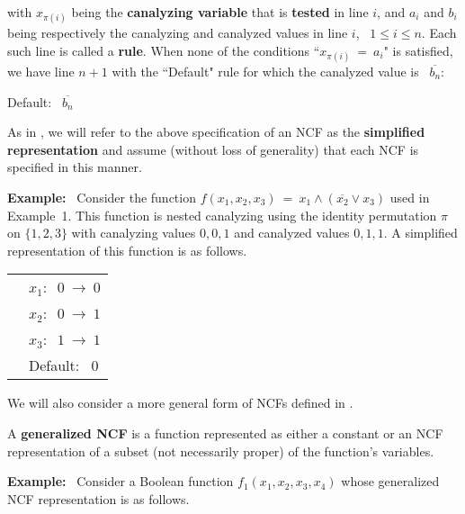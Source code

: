 \noindent
with $x_{\pi(i)}$ being the \textbf{canalyzing variable} that is
\textbf{tested} in line $i$,
and $a_i$ and $b_i$ being respectively the canalyzing and
canalyzed values in line $i$,~ $1 \leq i \leq n$.
Each such line is called a \textbf{rule}.
When none of the conditions ``$x_{\pi(i)} ~=~ a_i$"
is satisfied, we have line $n+1$ with the ``Default" rule
for which the canalyzed value is~ $\overline{b_n}$:

\medskip

\noindent
\hspace*{1.1in} Default:~ $\overline{b_n}$

\medskip
\noindent
As in \cite{Stearns-etal-2018}, we will refer to the above specification
of an NCF as the \textbf{simplified representation} and assume
(without loss of generality) that each NCF is specified in this manner.

\medskip
\noindent
\textbf{Example:}~ Consider the function
$f(x_1, x_2, x_3) ~=~ x_1 \wedge (\overline{x_2} \vee x_3)$
used in Example~1.
This function is nested canalyzing using the identity permutation $\pi$ on $\{1,2,3\}$
with canalyzing values $0,0,1$ and canalyzed values $0, 1, 1$.
A simplified representation of this function is as follows.

\medskip

\noindent
\begin{tabular}{ll}
\hspace*{1.1in} & $x_1:~$  $0 ~\longrightarrow~ 0$ \\ [1ex]
\hspace*{1.1in} & $x_2:~$  $0 ~\longrightarrow~ 1$ \\ [1ex]
\hspace*{1.1in} & $x_3:~$  $1 ~\longrightarrow~ 1$ \\ [1ex]
\hspace*{1.1in} & Default:~ $0$ \\
\end{tabular}

\medskip

\noindent
We will also consider a more general form of NCFs defined in
\cite{Stearns-etal-2018}.

\begin{definition}\label{def:generalized ncf}
A {\bf generalized NCF} is a function represented as either a constant
or an NCF representation of a subset (not necessarily proper)
of the function's variables.
\end{definition}

\noindent
\textbf{Example:}~ Consider a Boolean function $f_1(x_1, x_2, x_3, x_4)$
whose generalized NCF representation is as follows.


